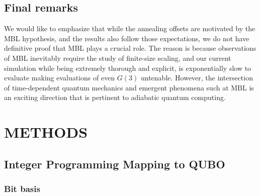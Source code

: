 \documentclass[prd,twocolumn,tightenlines,preprintnumbers,showpacs,superscriptaddress,notitlepage,nofootinbib,eqsecnum,floatfix,longbibliography,aps,10pt]{revtex4-2}
\begin{document}
\subsection{Final remarks}
We would like to emphasize that while the annealing offsets are motivated by the MBL hypothesis, and the results also follow those expectations, we do not have definitive proof that MBL plays a crucial role.
The reason is because observations of MBL inevitably require the study of finite-size scaling, and our current simulation while being extremely thorough and explicit, is exponentially slow to evaluate making evaluations of even $G(3)$ untenable.
However, the intersection of time-dependent quantum mechanics and emergent phenomena such at MBL is an exciting direction that is pertinent to adiabatic quantum computing.






\section{METHODS}
\label{sec:methods}

\subsection{Integer Programming Mapping to QUBO}
\label{sec:methods:ilp}

\subsubsection{Bit basis}
\label{sec:methods:bit-basis}
\end{document}
